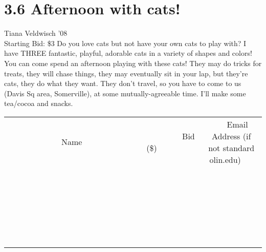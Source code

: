 \documentclass[11pt]{article}
\begin{document}
\section*{3.6 Afternoon with cats!}
Tiana Veldwisch '08
\\
Starting Bid: \$3
\newline
Do you love cats but not have your own cats to play with? I have THREE fantastic, playful, adorable cats in a variety of shapes and colors! You can come spend an afternoon playing with these cats! They may do tricks for treats, they will chase things, they may eventually sit in your lap, but they're cats, they do what they want. They don't travel, so you have to come to us (Davis Sq area, Somerville), at some mutually-agreeable time. I'll make some tea/cocoa and snacks.
\\[6ex]
\begin{tabular}{c c c}
~~~~~~~~~~~~~Name~~~~~~~~~~~~~ & ~~~~~~~~~Bid (\$)~~~~~~~~~  & ~~~Email Address (if not standard olin.edu)~~~\\
 & & \\
\hline
 & & \\
\hline
 & & \\
\hline
 & & \\
\hline
 & & \\
\hline
 & & \\
\hline
 & & \\
\hline
 & & \\
\hline
 & & \\
\hline
 & & \\
\hline
 & & \\
\hline
 & & \\
\hline
 & & \\
\hline
 & & \\
\hline
 & & \\
\hline
 & & \\
\hline
 & & \\
\hline
 & & \\
\hline
 & & \\
\hline
 & & \\
\hline
 & & \\
\hline
 & & \\
\hline
 & & \\
\hline
 & & \\
\hline
 & & \\
\hline
 & & \\
\hline
\end{tabular}
\newpage
\end{document}
